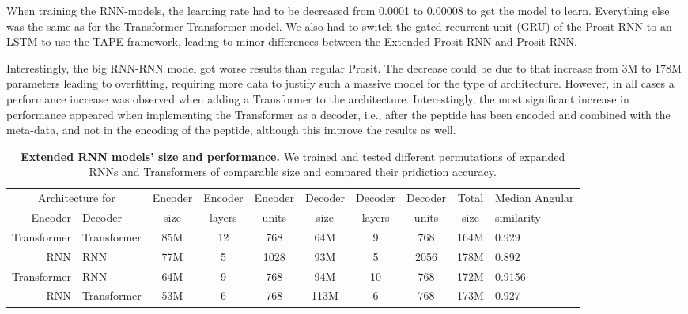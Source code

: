 \documentclass[10pt,a4paper]{article}
\begin{document}
When training the RNN-models, the learning rate had to be decreased from 0.0001 to 0.00008 to get the model to learn. Everything else was the same as for the Transformer-Transformer model. We also had to switch the gated recurrent unit (GRU) of the Prosit RNN to an LSTM to use the TAPE framework, leading to minor differences between the Extended Prosit RNN and Prosit RNN. 

Interestingly, the big RNN-RNN model got worse results than regular Prosit. The decrease could be due to that increase from 3M to 178M parameters leading to overfitting, requiring more data to justify such a massive model for the type of architecture. However, in all cases a performance increase was observed when adding a Transformer to the architecture. Interestingly, the most significant increase in performance appeared when implementing the Transformer as a decoder, i.e., after the peptide has been encoded and combined with the meta-data, and not in the encoding of the peptide, although this improve the results as well. 


\begin{table}[htbp]
    \caption{{\bf Extended RNN models' size and performance.} We trained and tested different permutations of expanded RNNs and Transformers of comparable size and compared their pridiction accuracy.}
      \begin{tabular}{r@{-}l|cccccccl}
      \hline
      \multicolumn{2}{c|}{Architecture for} & Encoder & Encoder & Encoder & Decoder & Decoder & Decoder & Total & Median Angular \\
      Encoder   & Decoder    & size    & layers & units & size    & layers & units   & size  & similarity \\
      \hline
      Transformer & Transformer & 85M   & 12 & 768 & 64M   & 9 & 768 & 164M  & 0.929 \\
      RNN & RNN & 77M   & 5 & 1028 & 93M   & 5 & 2056 & 178M  & 0.892 \\
      Transformer & RNN & 64M  & 9 & 768 & 94M   & 10 & 768  & 172M  & 0.9156 \\
      RNN & Transformer & 53M   & 6 & 768 & 113M   & 6 & 768  & 173M  & 0.927 \\
      \hline
      \end{tabular}%
    \label{tab:architecture}%
  \end{table}%
\end{document}
